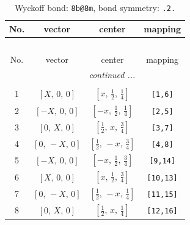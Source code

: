 \documentclass[fleqn,8pt]{jsarticle}
\begin{document}
\begin{longtable}{cccc}
\caption{Wyckoff bond: {\tt 8b@8m}, bond symmetry: {\tt .2.}}
 \\
 \hline \hline
No. & vector & center & mapping \\ \hline \endfirsthead

\multicolumn{3}{l}{\tablename\ \thetable{}} \\
 \hline \hline
No. & vector & center & mapping \\ \hline \endhead

 \hline \hline
\multicolumn{3}{r}{\footnotesize\it continued ...} \\ \endfoot

 \hline \hline
\multicolumn{3}{r}{} \\ \endlastfoot

1 & $\left[ X,\, 0,\, 0 \right]$ & $\left[ x,\, \frac{1}{2},\, \frac{1}{4} \right]$ & {\tt [1,6]} \\ \hline
2 & $\left[ - X,\, 0,\, 0 \right]$ & $\left[ - x,\, \frac{1}{2},\, \frac{1}{4} \right]$ & {\tt [2,5]} \\ \hline
3 & $\left[ 0,\, X,\, 0 \right]$ & $\left[ \frac{1}{2},\, x,\, \frac{3}{4} \right]$ & {\tt [3,7]} \\ \hline
4 & $\left[ 0,\, - X,\, 0 \right]$ & $\left[ \frac{1}{2},\, - x,\, \frac{3}{4} \right]$ & {\tt [4,8]} \\ \hline
5 & $\left[ - X,\, 0,\, 0 \right]$ & $\left[ - x,\, \frac{1}{2},\, \frac{3}{4} \right]$ & {\tt [9,14]} \\ \hline
6 & $\left[ X,\, 0,\, 0 \right]$ & $\left[ x,\, \frac{1}{2},\, \frac{3}{4} \right]$ & {\tt [10,13]} \\ \hline
7 & $\left[ 0,\, - X,\, 0 \right]$ & $\left[ \frac{1}{2},\, - x,\, \frac{1}{4} \right]$ & {\tt [11,15]} \\ \hline
8 & $\left[ 0,\, X,\, 0 \right]$ & $\left[ \frac{1}{2},\, x,\, \frac{1}{4} \right]$ & {\tt [12,16]} \\
\end{longtable}
\renewcommand{\arraystretch}{1.2}
\end{document}
